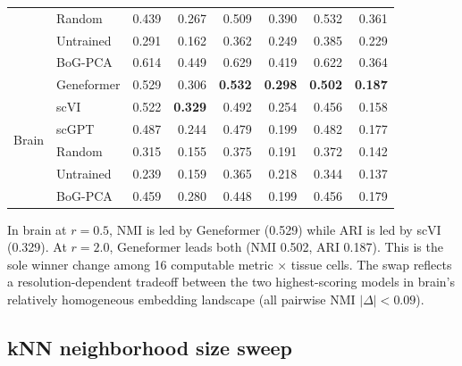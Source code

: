 \documentclass[9pt,lineno]{elife}
\begin{document}
\begin{table}[h!]
\begin{tabular}{@{}ll rr rr rr@{}}
 & Random     & 0.439 & 0.267 & 0.509 & 0.390 & 0.532 & 0.361 \\
 & Untrained  & 0.291 & 0.162 & 0.362 & 0.249 & 0.385 & 0.229 \\
 & BoG-PCA    & 0.614 & 0.449 & 0.629 & 0.419 & 0.622 & 0.364 \\
\midrule
\multirow{6}{*}{Brain}
 & Geneformer & 0.529 & 0.306 & \textbf{0.532} & \textbf{0.298} & \textbf{0.502} & \textbf{0.187} \\
 & scVI       & 0.522 & \textbf{0.329} & 0.492 & 0.254 & 0.456 & 0.158 \\
 & scGPT      & 0.487 & 0.244 & 0.479 & 0.199 & 0.482 & 0.177 \\
 & Random     & 0.315 & 0.155 & 0.375 & 0.191 & 0.372 & 0.142 \\
 & Untrained  & 0.239 & 0.159 & 0.365 & 0.218 & 0.344 & 0.137 \\
 & BoG-PCA    & 0.459 & 0.280 & 0.448 & 0.199 & 0.456 & 0.179 \\
\bottomrule
\end{tabular}
\end{table}

In brain at $r = 0.5$, NMI is led by Geneformer (0.529) while ARI is led by scVI (0.329). At $r = 2.0$, Geneformer leads both (NMI 0.502, ARI 0.187). This is the sole winner change among 16 computable metric $\times$ tissue cells. The swap reflects a resolution-dependent tradeoff between the two highest-scoring models in brain's relatively homogeneous embedding landscape (all pairwise NMI $|\Delta| < 0.09$).

\subsection{kNN neighborhood size sweep}
\end{document}

